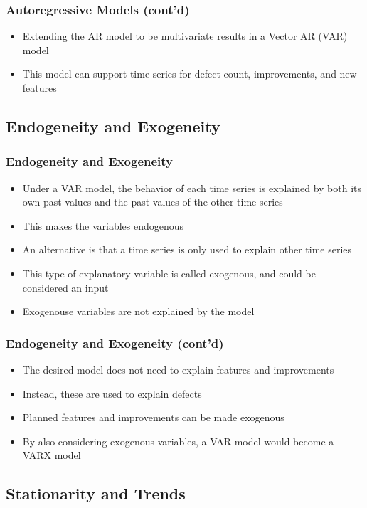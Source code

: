\documentclass[presentation]{beamer}
\begin{document}
\begin{frame}[t]
\frametitle{Autoregressive Models (cont'd)}
\begin{itemize}
\item{Extending the AR model to be multivariate results in a Vector AR (VAR) model}
\item{This model can support time series for defect count, improvements, and new features}
\end{itemize}
\end{frame}

\subsection{Endogeneity and Exogeneity}

\begin{frame}[t]
\frametitle{Endogeneity and Exogeneity}
\begin{itemize}
\item{Under a VAR model, the behavior of each time series is explained by both
its own past values and the past values of the other time series}
\item{This makes the variables endogenous}
\item{An alternative is that a time series is only used to explain other time series}
\item{This type of explanatory variable is called exogenous, and could be considered an input}
\item{Exogenouse variables are not explained by the model}
\end{itemize}
\end{frame}

\begin{frame}[t]
\frametitle{Endogeneity and Exogeneity (cont'd)}
\begin{itemize}
\item{The desired model does not need to explain features and improvements}
\item{Instead, these are used to explain defects}
\item{Planned features and improvements can be made exogenous}
\item{By also considering exogenous variables, a VAR model would become a
VARX model}
\end{itemize}
\end{frame}

\subsection{Stationarity and Trends}
\end{document}
